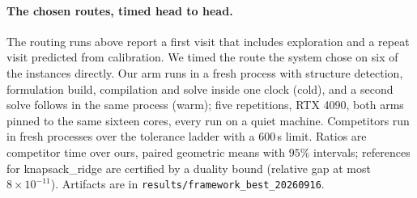\documentclass[11pt]{article}
\begin{document}
\paragraph{The chosen routes, timed head to head.}
The routing runs above report a first visit that includes exploration and a
repeat visit predicted from calibration. We timed the route the system chose on
six of the instances directly. Our arm runs in a fresh process with structure
detection, formulation build, compilation and solve inside one clock (cold), and
a second solve follows in the same process (warm); five repetitions, RTX 4090,
both arms pinned to the same sixteen cores, every run on a quiet machine.
Competitors run in fresh processes over the tolerance ladder with a 600\,s limit.
Ratios are competitor time over ours, paired geometric means with $95\%$
intervals; references for knapsack\_ridge are certified by a duality bound
(relative gap at most $8\times10^{-11}$). Artifacts are in
\texttt{results/framework\_best\_20260916}.
\end{document}
